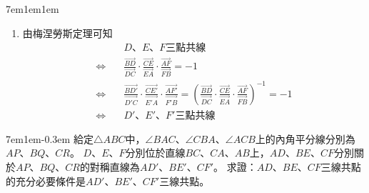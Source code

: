 \documentclass[12pt]{article}
\begin{document}
\begin{mybox}[Answer 8]{7em}{1em}{1em}
\begin{enumerate}[label=(\roman*)]
       \item 由梅涅勞斯定理可知
       \begin{align*}
           &\text{$D$、$E$、$F$三點共線}\\
           \Leftrightarrow\quad&\frac{\overrightarrow{BD}}{\overrightarrow{DC}}
           \cdot\frac{\overrightarrow{CE}}{\overrightarrow{EA}}
           \cdot\frac{\overrightarrow{AF}}{\overrightarrow{FB}}=-1\\
           \Leftrightarrow\quad&\frac{\overrightarrow{BD'}}{\overrightarrow{D'C}}
           \cdot\frac{\overrightarrow{CE'}}{\overrightarrow{E'A}}
           \cdot\frac{\overrightarrow{AF'}}{\overrightarrow{F'B}}
           =\left(\frac{\overrightarrow{BD}}{\overrightarrow{DC}}
           \cdot\frac{\overrightarrow{CE}}{\overrightarrow{EA}}
           \cdot\frac{\overrightarrow{AF}}{\overrightarrow{FB}}\right)^{-1}=-1\\
           \Leftrightarrow\quad&\text{$D'$、$E'$、$F'$三點共線}
        \end{align*}
   \end{enumerate}
\end{mybox}
\begin{mybox}[Problem 9]{7em}{1em}{-0.3em}
   給定$\triangle{ABC}$中，$\angle{BAC}$、$\angle{CBA}$、$\angle{ACB}$上的內角平分線分別為$AP$、$BQ$、$CR$。
   $D$、$E$、$F$分別位於直線$BC$、$CA$、$AB$上，$AD$、$BE$、$CF$分別關於$AP$、$BQ$、$CR$的對稱直線為$AD'$、$BE'$、$CF'$。
   求證：$AD$、$BE$、$CF$三線共點的充分必要條件是$AD'$、$BE'$、$CF'$三線共點。
\end{mybox}
\end{document}
